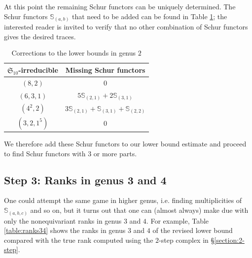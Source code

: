 \documentclass[12pt]{article}
\newcommand{\SymGroup}[1][n]{\mathfrak{S}_{#1}}
\newcommand{\Specht}[1]{\chi_{#1}}
\newcommand{\Schur}[1]{\mathbb{S}_{#1}}
\theoremstyle{plain}
\theoremstyle{definition}
\theoremstyle{remark}
\begin{document}
At this point the remaining Schur functors can be uniquely determined. The Schur functors $\Schur{(a,b)}$ that need to be added can be found in Table \ref{table:additional_Schur_genus2}; the interested reader is invited to verify that no other combination of Schur functors gives the desired traces.

\begin{table}[h]
    \centering
    \begin{tabular}{|c|c|}
\hline
$\SymGroup[10]$-irreducible & Missing Schur functors \\
\hline
$(8,2)$ & $0$ \\
\hline
$(6,3,1)$ &  $5\Schur{(2,1)} + 2\Schur{(3,1)}$\\
\hline
$(4^2,2)$ & $3\Schur{(2,1)} + \Schur{(3,1)} + \Schur{(2,2)}$ \\
\hline
$(3,2,1^5)$ & $0$ \\
\hline
    \end{tabular}
    \caption{Corrections to the lower bounds in genus $2$}
    \label{table:additional_Schur_genus2}
\end{table}

We therefore add these Schur functors to our lower bound estimate and proceed to find Schur functors with $3$ or more parts.

\subsection*{Step 3: Ranks in genus 3 and 4}

One could attempt the same game in higher genus, i.e. finding multiplicities of $\Schur{(a,b,c)}$ and so on, but it turns out that one can (almost always) make due with only the nonequivariant ranks in genus $3$ and $4$. For example, Table \ref{table:ranks34} shows the ranks in genus $3$ and $4$ of the revised lower bound compared with the true rank computed using the $2$-step complex in \S\ref{section:2-step}.

\end{document}

